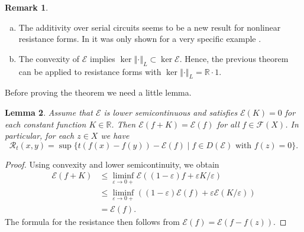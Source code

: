 \documentclass[a4paper,11pt,reqno]{amsart}
\newtheorem{lemma}{Lemma}[section]
\theoremstyle{definition}
\newtheorem{remark}[lemma]{Remark}
\numberwithin{equation}{section}
\newcommand{\cR}{{\mathcal R}}
\newcommand{\cE}{{\mathcal E}}
\newcommand{\cF}{{\mathcal F}}
\newcommand{\R}{{\mathbb R}}
\newcommand{\av}[1]{\left\Vert #1\right\Vert}
\newcommand{\1}{\mathds{1}}
\begin{document}
\begin{remark}
 \begin{enumerate}[(a)]
  \item The additivity over serial circuits seems to be a new result for nonlinear resistance forms. In \cite{KS25} it was only shown for a very specific example \cite[Example 6.34]{KS25}.
  \item The convexity of $\cE$ implies $\ker \av{\cdot}_L \subset \ker \cE$. Hence, the previous theorem can be applied to resistance forms with $\ker \av{\cdot}_L = \R \cdot 1$. 
 \end{enumerate}
\end{remark}



Before proving the theorem we need a little lemma. 

\begin{lemma}\label{lemma:slightly different formula resistance}
 Assume that $\cE$ is lower semicontinuous and satisfies $\cE(K) = 0$ for each constant function $K \in \R$. Then $\cE(f + K) = \cE(f)$ for all $f \in \cF(X)$. In particular, for each $z  \in X$ we have
 $$\cR_t(x,y) = \sup \{t (f(x) - f(y)) - \cE(f) \mid f \in D(\cE) \text{ with } f(z) = 0\}.$$
\end{lemma}
\begin{proof}
 Using convexity and lower semicontinuity, we obtain 
 \begin{align*}
 \cE(f + K) &\leq \liminf_{\varepsilon \to 0+} \cE((1-\varepsilon) f + \varepsilon K/\varepsilon)\\
  &\leq \liminf_{\varepsilon \to 0+} \left((1-\varepsilon) \cE(f) + \varepsilon \cE(K/\varepsilon)\right)\\
  &=\cE(f).  
 \end{align*}
 The formula for the resistance then follows from $\cE(f) = \cE(f - f(z))$. 
\end{proof}
\end{document}
